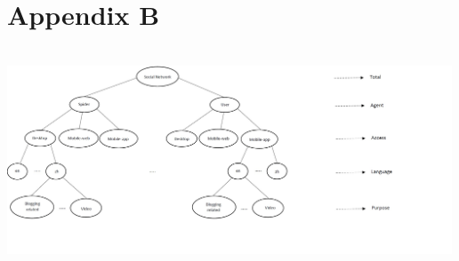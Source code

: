 \documentclass[11pt,a4paper,]{article}
\let\origfigure\figure
\let\endorigfigure\endfigure
\renewenvironment{figure}[1][2] {
    \expandafter\origfigure\expandafter[!htbp]
} {
    \endorigfigure
}
\begin{document}
\hypertarget{appendixB}{%
\section*{Appendix B}\label{appendixB}}

\begin{figure}

{\centering \includegraphics[width=500px,height=250px]{Paper-Figures/Wiki_group_structure} 

}

\caption{One of the possible hierarchical structures for the Wikipedia pageview dataset.}\label{fig:wikigroupstructure}
\end{figure}

\clearpage

\printbibliography
\end{document}
